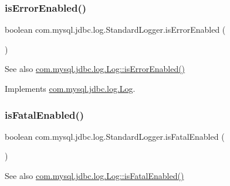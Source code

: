 \mbox{\label{classcom_1_1mysql_1_1jdbc_1_1log_1_1_standard_logger_a58e4e9a985cc55c3a1612588af36dcbf}} 
\subsubsection{\texorpdfstring{is\+Error\+Enabled()}{isErrorEnabled()}}
{\footnotesize\ttfamily boolean com.\+mysql.\+jdbc.\+log.\+Standard\+Logger.\+is\+Error\+Enabled (\begin{DoxyParamCaption}{ }\end{DoxyParamCaption})}

\begin{DoxySeeAlso}{See also}
\mbox{\hyperlink{interfacecom_1_1mysql_1_1jdbc_1_1log_1_1_log_aece1d483e86ea84bd1553ed993c56c59}{com.\+mysql.\+jdbc.\+log.\+Log\+::is\+Error\+Enabled()}} 
\end{DoxySeeAlso}


Implements \mbox{\hyperlink{interfacecom_1_1mysql_1_1jdbc_1_1log_1_1_log_aece1d483e86ea84bd1553ed993c56c59}{com.\+mysql.\+jdbc.\+log.\+Log}}.

\mbox{\label{classcom_1_1mysql_1_1jdbc_1_1log_1_1_standard_logger_ac51a86817ad34e81d451b8023e255845}} 
\subsubsection{\texorpdfstring{is\+Fatal\+Enabled()}{isFatalEnabled()}}
{\footnotesize\ttfamily boolean com.\+mysql.\+jdbc.\+log.\+Standard\+Logger.\+is\+Fatal\+Enabled (\begin{DoxyParamCaption}{ }\end{DoxyParamCaption})}

\begin{DoxySeeAlso}{See also}
\mbox{\hyperlink{interfacecom_1_1mysql_1_1jdbc_1_1log_1_1_log_acc3f527d8a1e3143e312eb4368c3632a}{com.\+mysql.\+jdbc.\+log.\+Log\+::is\+Fatal\+Enabled()}} 
\end{DoxySeeAlso}


